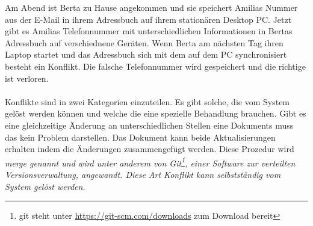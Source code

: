 Am Abend ist Berta zu Hause angekommen und sie speichert Amilias Nummer aus der E-Mail in ihrem Adressbuch auf ihrem stationären Desktop PC.
Jetzt gibt es Amilias Telefonnummer mit unterschiedlichen Informationen in Bertas Adressbuch auf verschiednene Geräten.
Wenn Berta am nächsten Tag ihren Laptop startet und das Adressbuch sich mit dem auf dem PC synchronisiert besteht ein Konflikt. Die falsche Telefonnummer wird gespeichert und die richtige ist verloren.\\\\
%
%
Konflikte sind in zwei Kategorien einzuteilen. Es gibt solche, die vom System gelöst werden können und welche die eine spezielle Behandlung brauchen.
Gibt es eine gleichzeitige Änderung an unterschiedlichen Stellen eine Dokuments muss das kein Problem darstellen.
Das Dokument kann beide Aktualisierungen erhalten indem die Änderungen zusammengefügt werden.
Diese Prozedur wird \it{merge} genannt und wird unter anderem von Git\footnote{git steht unter \url{https://git-scm.com/downloads} zum Download bereit}, einer Software zur verteilten Versionsverwaltung, angewandt. Diese Art Konflikt kann selbstständig vom System gelöst werden.\\


